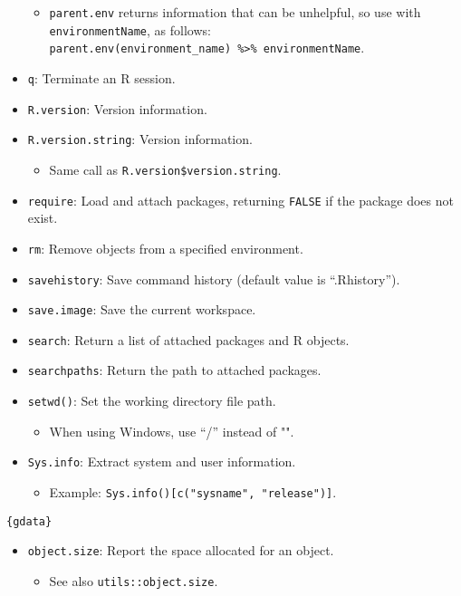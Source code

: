 \documentclass[]{book}
\providecommand{\tightlist}{%
  \setlength{\itemsep}{0pt}\setlength{\parskip}{0pt}}
\begin{document}
\begin{itemize}
  \begin{itemize}
  \tightlist
  \item
    \texttt{parent.env} returns information that can be unhelpful, so use with \texttt{environmentName}, as follows: \texttt{parent.env(environment\_name)\ \%\textgreater{}\%\ environmentName}.
  \end{itemize}
\item
  \texttt{q}: Terminate an R session.
\item
  \texttt{R.version}: Version information.
\item
  \texttt{R.version.string}: Version information.

  \begin{itemize}
  \tightlist
  \item
    Same call as \texttt{R.version\$version.string}.
  \end{itemize}
\item
  \texttt{require}: Load and attach packages, returning \texttt{FALSE} if the package does not exist.
\item
  \texttt{rm}: Remove objects from a specified environment.
\item
  \texttt{savehistory}: Save command history (default value is ``.Rhistory'').
\item
  \texttt{save.image}: Save the current workspace.
\item
  \texttt{search}: Return a list of attached packages and R objects.
\item
  \texttt{searchpaths}: Return the path to attached packages.
\item
  \texttt{setwd()}: Set the working directory file path.

  \begin{itemize}
  \tightlist
  \item
    When using Windows, use ``/'' instead of "".
  \end{itemize}
\item
  \texttt{Sys.info}: Extract system and user information.

  \begin{itemize}
  \tightlist
  \item
    Example: \texttt{Sys.info(){[}c("sysname",\ "release"){]}}.
  \end{itemize}
\end{itemize}

\texttt{\{gdata\}}

\begin{itemize}
\tightlist
\item
  \texttt{object.size}: Report the space allocated for an object.

  \begin{itemize}
  \tightlist
  \item
    See also \texttt{utils::object.size}.
  \end{itemize}
\end{itemize}
\end{document}
